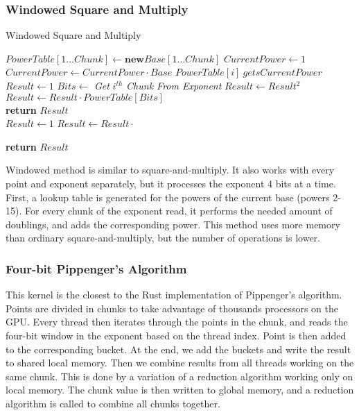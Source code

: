 \subsubsection{Windowed Square and Multiply}
\begin{algorithm}
    \caption{Windowed Square and Multiply}\label{multiexp}
    \begin{algorithmic}[1]
        \State $PowerTable[1 \dots Chunk] \gets \textbf{new} Base[1 \dots Chunk]$
        \State $CurrentPower \gets 1$
        \\
            \State $CurrentPower \gets CurrentPower \cdot Base$
            \State $PowerTable[i] \ gets CurrentPower$
        \EndFor
        \\
        \State $Result \gets 1$
            \State $Bits \gets $ \textit{Get }$i^{th}$ \textit{ Chunk From Exponent}
                \State $Result \gets Result^2$
            \EndFor
            \\
                \State $Result \gets Result \cdot PowerTable[Bits]$
            \EndIf
        \EndFor
        \\
        \State \textbf{return} $Result$
    \EndFunction
    \\
        \State $Result \gets 1$
            \State $Result \gets Result \cdot $
        \EndFor
    
        \State \textbf{return} $Result$
        
    \EndFunction
    \end{algorithmic}
\end{algorithm}
Windowed method is similar to square-and-multiply. It also works with every point and exponent separately, but it processes the exponent 4 bits at a time. First, a lookup table is generated for the powers of the current base (powers 2-15). For every chunk of the exponent read, it performs the needed amount of doublings, and adds the corresponding power. This method uses more memory than ordinary square-and-multiply, but the number of operations is lower.
\subsubsection{Four-bit Pippenger's Algorithm}
This kernel is the closest to the Rust implementation of Pippenger's algorithm. Points are divided in chunks to take advantage of thousands processors on the GPU. Every thread then iterates through the points in the chunk, and reads the four-bit window in the exponent based on the thread index. Point is then added to the corresponding bucket. At the end, we add the buckets and write the result to shared local memory. Then we combine results from all threads working on the same chunk. This is done by a variation of a reduction algorithm working only on local memory. The chunk value is then written to global memory, and a reduction algorithm is called to combine all chunks together.
